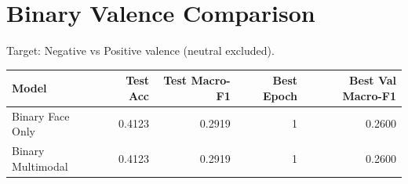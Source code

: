 \documentclass{article}
\begin{document}
\section*{Binary Valence Comparison}
Target: Negative vs Positive valence (neutral excluded).
\begin{tabular}{lrrrr}
\hline
Model & Test Acc & Test Macro-F1 & Best Epoch & Best Val Macro-F1 \\
\hline
Binary Face Only & 0.4123 & 0.2919 & 1 & 0.2600 \\
Binary Multimodal & 0.4123 & 0.2919 & 1 & 0.2600 \\
\hline
\end{tabular}
\end{document}
